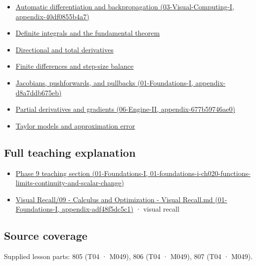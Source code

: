 \begin{itemize}
\tightlist
\item
  \href{../03-Visual-Computing-I/main.pdf\#nameddest=appendix-40df0855b4a7}{Automatic differentiation and backpropagation (03-Visual-Computing-I, appendix-40df0855b4a7)}
\item
  \hyperref[appendix-1a50e72435c2]{Definite integrals and the fundamental theorem}
\item
  \hyperref[appendix-e2d476574aab]{Directional and total derivatives}
\item
  \hyperref[appendix-e2d7b4f2161d]{Finite differences and step-size balance}
\item
  \href{../01-Foundations-I/main.pdf\#nameddest=appendix-d8a7ddb675eb}{Jacobians, pushforwards, and pullbacks (01-Foundations-I, appendix-d8a7ddb675eb)}
\item
  \href{../06-Engine-II/main.pdf\#nameddest=appendix-677b59746ae0}{Partial derivatives and gradients (06-Engine-II, appendix-677b59746ae0)}
\item
  \hyperref[appendix-32f39e9a3738]{Taylor models and approximation error}
\end{itemize}

\subsection{Full teaching explanation}\label{appendix-7bc181935c42-full-teaching-explanation}

\begin{itemize}
\tightlist
\item
  \href{../01-Foundations-I/main.pdf\#nameddest=01-foundations-i-ch020-functions-limits-continuity-and-scalar-change}{Phase 9 teaching section (01-Foundations-I, 01-foundations-i-ch020-functions-limits-continuity-and-scalar-change)}
\item
  \href{../01-Foundations-I/main.pdf\#nameddest=appendix-adf48f5dc5c1}{Visual Recall/09 - Calculus and Optimization - Visual Recall.md (01-Foundations-I, appendix-adf48f5dc5c1)} · visual recall
\end{itemize}

\subsection{Source coverage}\label{appendix-7bc181935c42-source-coverage}

Supplied lesson parts: 805 (T04 · M049), 806 (T04 · M049), 807 (T04 · M049).
